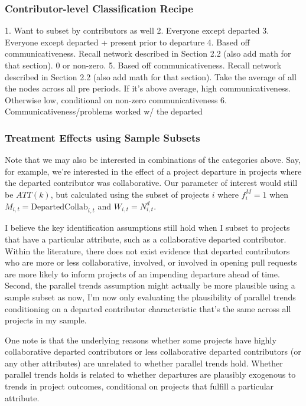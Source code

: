 \documentclass[12pt,notitlepage]{article}
\begin{document}
\subsubsection{Contributor-level Classification Recipe}
1. Want to subset by contributors as well
2. Everyone except departed
3. Everyone except departed + present prior to departure
4. Based off communicativeness. Recall network described in Section 2.2 (also add math for that section). 0 or non-zero. 
5. Based off communicativeness. Recall network described in Section 2.2 (also add math for that section). Take the average of all the nodes across all pre periods. If it's above average, high communicativeness. Otherwise low, conditional on non-zero communicativeness
6. Communicativeness/problems worked w/ the departed

\subsubsection{Treatment Effects using Sample Subsets}
Note that we may also be interested in combinations of the categories above. Say, for example, we're interested in the effect of a project departure in projects where the departed contributor was collaborative. Our parameter of interest would still be $ATT(k)$, but calculated using the subset of projects $i$ where $f_i^M = 1$ when $M_{i,t} = \mathrm{DepartedCollab}_{i,t}$ and $W_{i,t} = N_{i,t}^d$. 

I believe the key identification assumptions still hold when I subset to projects that have a particular attribute, such as a collaborative departed contributor. Within the literature, there does not exist evidence that departed contributors who are more or less collaborative, involved, or involved in opening pull requests are more likely to inform projects of an impending departure ahead of time. Second, the parallel trends assumption might actually be more plausible using a sample subset as now, I'm now only evaluating the plausibility of parallel trends conditioning on a departed contributor characteristic that's the same across all projects in my sample.

One note is that the underlying reasons whether some projects have highly collaborative departed contributors or less collaborative departed contributors (or any other attributes) are unrelated to whether parallel trends hold. Whether parallel trends holds is related to whether departures are plausibly exogenous to trends in project outcomes, conditional on projects that fulfill a particular attribute. 
\end{document}
